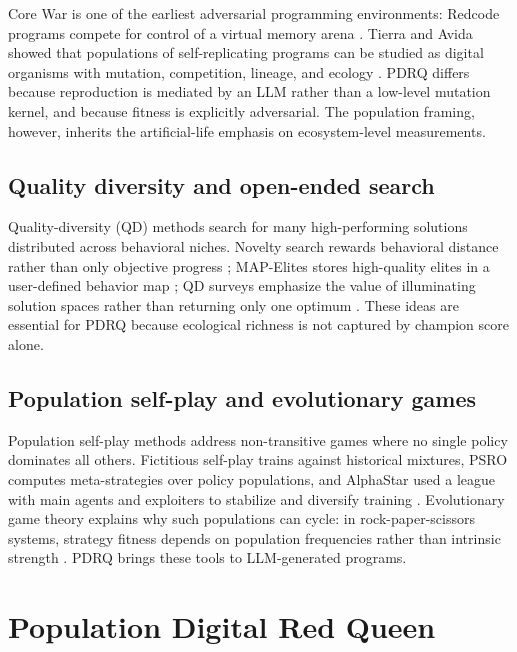 \documentclass[11pt]{article}
\begin{document}
Core War is one of the earliest adversarial programming environments: Redcode programs compete for control of a virtual memory arena \citep{dewdney1984corewar}. Tierra and Avida showed that populations of self-replicating programs can be studied as digital organisms with mutation, competition, lineage, and ecology \citep{ray1991tierra,adami1994avida,ofria2004avida}. PDRQ differs because reproduction is mediated by an LLM rather than a low-level mutation kernel, and because fitness is explicitly adversarial. The population framing, however, inherits the artificial-life emphasis on ecosystem-level measurements.

\subsection{Quality diversity and open-ended search}

Quality-diversity (QD) methods search for many high-performing solutions distributed across behavioral niches. Novelty search rewards behavioral distance rather than only objective progress \citep{lehman2011novelty,lehman2011objectives}; MAP-Elites stores high-quality elites in a user-defined behavior map \citep{mouret2015mapelites}; QD surveys emphasize the value of illuminating solution spaces rather than returning only one optimum \citep{pugh2016quality}. These ideas are essential for PDRQ because ecological richness is not captured by champion score alone.

\subsection{Population self-play and evolutionary games}

Population self-play methods address non-transitive games where no single policy dominates all others. Fictitious self-play trains against historical mixtures, PSRO computes meta-strategies over policy populations, and AlphaStar used a league with main agents and exploiters to stabilize and diversify training \citep{heinrich2016nfsp,lanctot2017psro,vinyals2019alphastar}. Evolutionary game theory explains why such populations can cycle: in rock-paper-scissors systems, strategy fitness depends on population frequencies rather than intrinsic strength \citep{maynard1982evolution,sinervo1996rps,hofbauer1998evolutionary}. PDRQ brings these tools to LLM-generated programs.

\section{Population Digital Red Queen}
\end{document}
